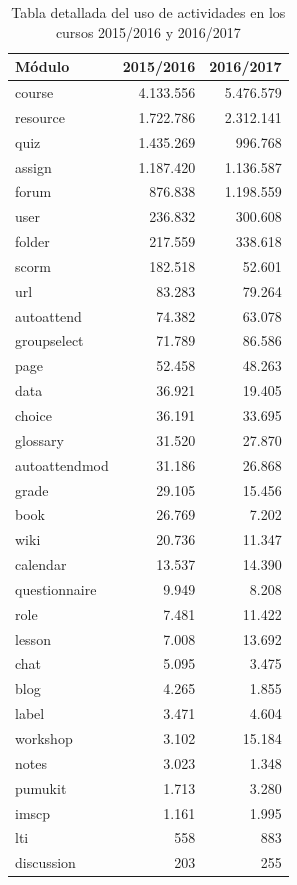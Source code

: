 \begin{table}[H]
\centering
\begin{tabular}{|l|r|r|}
\hline
\textbf{Módulo} & \textbf{2015/2016} & \textbf{2016/2017} \\ \hline
course        & 4.133.556 & 5.476.579 \\
resource      & 1.722.786 & 2.312.141 \\
quiz          & 1.435.269 & 996.768   \\
assign        & 1.187.420 & 1.136.587 \\
forum         & 876.838   & 1.198.559 \\
user          & 236.832   & 300.608   \\
folder        & 217.559   & 338.618   \\
scorm         & 182.518   & 52.601    \\
url           & 83.283    & 79.264    \\
autoattend    & 74.382    & 63.078    \\
groupselect   & 71.789    & 86.586    \\
page          & 52.458    & 48.263    \\
data          & 36.921    & 19.405    \\
choice        & 36.191    & 33.695    \\
glossary      & 31.520    & 27.870    \\
autoattendmod & 31.186    & 26.868    \\
grade         & 29.105    & 15.456    \\
book          & 26.769    & 7.202     \\
wiki          & 20.736    & 11.347    \\
calendar      & 13.537    & 14.390    \\
questionnaire & 9.949     & 8.208     \\
role          & 7.481     & 11.422    \\
lesson        & 7.008     & 13.692    \\
chat          & 5.095     & 3.475     \\
blog          & 4.265     & 1.855     \\
label         & 3.471     & 4.604     \\
workshop      & 3.102     & 15.184    \\
notes         & 3.023     & 1.348     \\
pumukit       & 1.713     & 3.280     \\
imscp         & 1.161     & 1.995     \\
lti           & 558       & 883       \\
discussion    & 203       & 255      
\end{tabular}
\caption{Tabla detallada del uso de actividades en los cursos 2015/2016 y 2016/2017}
\label{table:usoactividades_2015}
\end{table}


